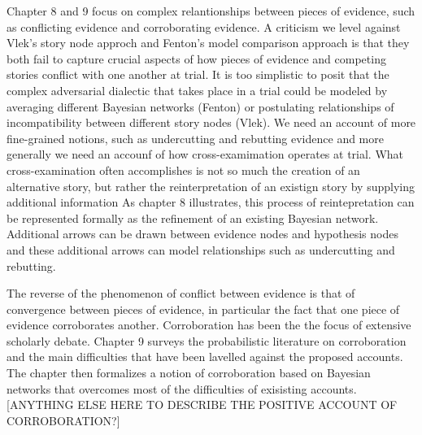 \documentclass[10pt,dvipsnames,enabledeprecatedfontcommands]{scrartcl}
\begin{document}
Chapter 8 and 9 focus on complex relantionships between pieces of
evidence, such as conflicting evidence and corroborating evidence. A
criticism we level against Vlek's story node approch and Fenton's model
comparison approach is that they both fail to capture crucial aspects of
how pieces of evidence and competing stories conflict with one another
at trial. It is too simplistic to posit that the complex adversarial
dialectic that takes place in a trial could be modeled by averaging
different Bayesian networks (Fenton) or postulating relationships of
incompatibility between different story nodes (Vlek). We need an account
of more fine-grained notions, such as undercutting and rebutting
evidence and more generally we need an accounf of how cross-examimation
operates at trial. What cross-examination often accomplishes is not so
much the creation of an alternative story, but rather the
reinterpretation of an existign story by supplying additional
information As chapter 8 illustrates, this process of reintepretation
can be represented formally as the refinement of an existing Bayesian
network. Additional arrows can be drawn between evidence nodes and
hypothesis nodes and these additional arrows can model relationships
such as undercutting and rebutting.

The reverse of the phenomenon of conflict between evidence is that of
convergence between pieces of evidence, in particular the fact that one
piece of evidence corroborates another. Corroboration has been the the
focus of extensive scholarly debate. Chapter 9 surveys the probabilistic
literature on corroboration and the main difficulties that have been
lavelled against the proposed accounts. The chapter then formalizes a
notion of corroboration based on Bayesian networks that overcomes most
of the difficulties of exisisting accounts. {[}ANYTHING ELSE HERE TO
DESCRIBE THE POSITIVE ACCOUNT OF CORROBORATION?{]}
\end{document}
